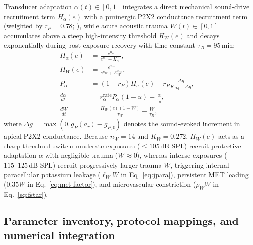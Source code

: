 \documentclass[final,5p,times]{elsarticle}
\begin{document}
Transducer adaptation \(\alpha(t) \in [0,1]\) integrates a direct mechanical sound-drive recruitment term \(H_\alpha(e)\) with a purinergic P2X2 conductance recruitment term (weighted by \(r_P = 0.78\); \citealt{Housley2013}), while acute acoustic trauma \(W(t) \in [0,1]\) accumulates above a steep high-intensity threshold \(H_W(e)\) and decays exponentially during post-exposure recovery with time constant \(\tau_R = 95\,\mathrm{min}\):
\begin{align}
  H_\alpha(e) &= \frac{e^{n_\alpha}}{e^{n_\alpha} + K_\alpha^{n_\alpha}}, \label{eq:halpha}\\
  H_W(e) &= \frac{e^{n_W}}{e^{n_W} + K_W^{n_W}}, \label{eq:hw}\\
  P_\alpha &= (1 - r_P)H_\alpha(e) + r_P\frac{\Delta g}{K_{\Delta g} + \Delta g}, \label{eq:palpha}\\
  \frac{d\alpha}{dt} &= r_\alpha^{\mathrm{rate}} P_\alpha(1 - \alpha) - \frac{\alpha}{\tau_\alpha}, \label{eq:dalpha}\\
  \frac{dW}{dt} &= \frac{H_W(e)(1 - W)}{\tau_W} - \frac{W}{\tau_R}, \label{eq:dw}
\end{align}
where \(\Delta g = \max(0, g_P(a_r) - g_{P,0})\) denotes the sound-evoked increment in apical P2X2 conductance. Because \(n_W = 14\) and \(K_W = 0.272\), \(H_W(e)\) acts as a sharp threshold switch: moderate exposures (\(\le 105\,\mathrm{dB}\) SPL) recruit protective adaptation \(\alpha\) with negligible trauma (\(W \approx 0\)), whereas intense exposures (\(115\text{--}125\,\mathrm{dB}\) SPL) recruit progressively larger trauma \(W\), triggering internal paracellular potassium leakage (\(\ell_W W\) in Eq.~\ref{eq:jpara}), persistent MET loading (\(0.35W\) in Eq.~\ref{eq:met-factor}), and microvascular constriction (\(\rho_W W\) in Eq.~\ref{eq:fstar}).

\subsection{Parameter inventory, protocol mappings, and numerical integration}\label{sec:formulation-parameters}
\end{document}
